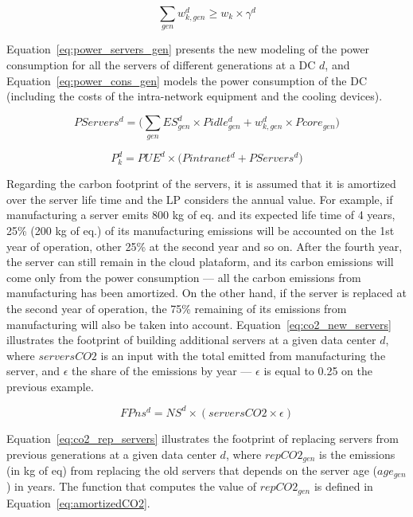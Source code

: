 \begin{equation} \label{eq:workload_category}
 \sum_{gen}  w_{k,gen}^d \geq  w_k \times \gamma^d
\end{equation}


Equation~\eqref{eq:power_servers_gen} presents the new modeling of the power consumption for all the servers of different generations at a DC $d$, and Equation~\eqref{eq:power_cons_gen} models the power consumption of the DC (including the costs of the intra-network equipment and the cooling devices).


\begin{equation} \label{eq:power_servers_gen}
   PServers^d  =  \big(   \sum_{gen} ES_{gen}^d \times  Pidle_{gen}^d + w^d_{k,gen}  \times  Pcore_{gen} \big)
\end{equation}


\begin{equation} \label{eq:power_cons_gen}
   P^d_k  = PUE^d \times \big(  Pintranet^d + PServers^d\big)
\end{equation}


Regarding the carbon footprint of the servers, it is assumed that it is amortized over the server life time and the LP considers the annual value. For example, if manufacturing a server emits 800 kg of  eq. and its expected life time of 4 years, 25\% (200 kg of  eq.) of its manufacturing emissions will be accounted on the 1st year of operation, other 25\% at the second year and so on. After the fourth year, the server can still remain in the cloud plataform, and its carbon emissions will come only from the power consumption --- all the carbon emissions from manufacturing has been amortized.  On the other hand, if the server is replaced at the second year of operation, the 75\% remaining of its emissions from manufacturing will also be taken into account. Equation~\eqref{eq:co2_new_servers} illustrates the footprint of building additional servers at a given data center $d$, where $serversCO2$ is an input with the total  emitted from manufacturing the server, and $\epsilon$ the share of the emissions by year ---  $\epsilon$ is equal to 0.25 on the previous example.


\begin{equation} \label{eq:co2_new_servers}
FPns^d = NS^d \times ( serversCO2 \times \epsilon)	
\end{equation}


Equation~\eqref{eq:co2_rep_servers} illustrates the footprint of replacing servers from previous generations at a given data center $d$, where $repCO2_{gen}$ is the emissions (in kg of  eq) from replacing the old servers that depends on the server age ($age_{gen}$) in years. The function that computes the value of  $repCO2_{gen}$  is defined in Equation~\eqref{eq:amortizedCO2}. 

